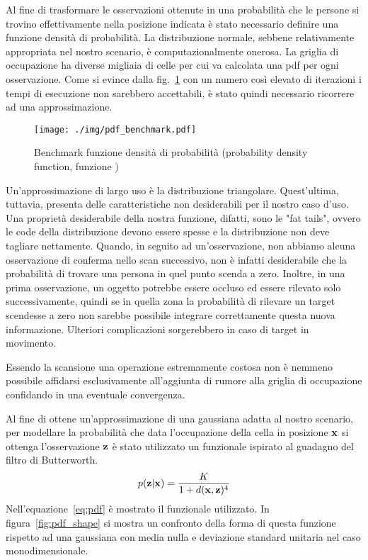\documentclass[10pt]{beamer}
\begin{document}
	Al fine di trasformare le osservazioni ottenute in una probabilità che le
	persone si trovino effettivamente nella posizione indicata è stato
	necessario definire una funzione densità di probabilità. La distribuzione
	normale, sebbene relativamente appropriata nel nostro scenario, è
	computazionalmente onerosa. La griglia di occupazione ha diverse migliaia
	di celle per cui va calcolata una pdf per ogni osservazione. Come si evince
	dalla fig.~\ref{fig:pdf_benchmark} con un numero così elevato di iterazioni
	i tempi di esecuzione non sarebbero accettabili, è stato quindi necessario
	ricorrere ad una approssimazione.
	
	\begin{figure}[H]
		\centering
		\texttt{[image: ./img/pdf\_benchmark.pdf]}
		\caption{Benchmark funzione densità di probabilità (probability density function, funzione )}
		\label{fig:pdf_benchmark}
	\end{figure}

	Un'approssimazione di largo uso è la distribuzione triangolare.
	Quest'ultima, tuttavia, presenta delle caratteristiche non desiderabili per
	il nostro caso d'uso. Una proprietà desiderabile della nostra funzione,
	difatti, sono le "fat tails", ovvero le code della distribuzione devono
	essere spesse e la distribuzione non deve tagliare nettamente. Quando, in
	seguito ad un'osservazione, non abbiamo alcuna osservazione di conferma
	nello scan successivo, non è infatti desiderabile che la probabilità di
	trovare una persona in quel punto scenda a zero. Inoltre, in una prima
	osservazione, un oggetto potrebbe essere occluso ed essere rilevato solo
	successivamente, quindi se in quella zona la probabilità di rilevare un
	target scendesse a zero non sarebbe possibile integrare correttamente
	questa nuova informazione. Ulteriori complicazioni sorgerebbero in caso di
	target in movimento.
	
	Essendo la scansione una operazione estremamente costosa non è nemmeno
	possibile affidarsi esclusivamente all'aggiunta di rumore alla griglia di
	occupazione confidando in una eventuale convergenza.

	Al fine di ottene un'approssimazione di una gaussiana adatta al
	nostro scenario, per modellare la probabilità che data l'occupazione della
	cella in posizione $ {\bf x} $ si ottenga l'osservazione $ {\bf z} $ è
	stato utilizzato un funzionale ispirato al guadagno del filtro di
	Butterworth.
	\begin{equation}\label{eq:pdf}
		p({\bf z}|{\bf x}) = \frac	{K}
		{1 + d({\bf x},{\bf z})^4 } 
	\end{equation}
	Nell'equazione~\ref{eq:pdf} è mostrato il funzionale utilizzato. In
	figura~\ref{fig:pdf_shape} si mostra un confronto della forma di questa
	funzione rispetto ad una gaussiana con media nulla e deviazione standard
	unitaria nel caso monodimensionale.
	
\end{document}
